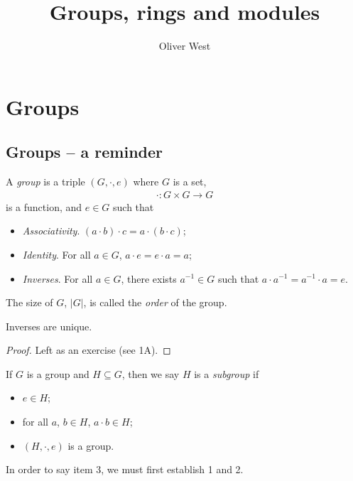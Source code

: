 \documentclass{../template/note}
\author{Oliver West}
\title{Groups, rings and modules}
\date{}
\begin{document}
    \maketitle

    \tableofcontents


    \section{Groups}

    \subsection{Groups -- a reminder}

    \begin{definition}
        A \emph{group} is a triple $(G, \cdot, e)$ where $G$ is a set, 
        \begin{align*}
            \cdot: G \times G \to G
        \end{align*}
        is a function, and $e \in G$ such that
        \begin{itemize}
            \item \emph{Associativity}. $(a \cdot b) \cdot c = a \cdot (b \cdot c)$;
            \item \emph{Identity}. For all $a \in G$, $a \cdot e = e \cdot a = a$;
            \item \emph{Inverses}. For all $a \in G$, there exists $a^{-1} \in G$ such that $a \cdot a^{-1} = a^{-1} \cdot a = e$.
        \end{itemize}
        The size of $G$, $|G|$, is called the \emph{order} of the group. 
    \end{definition}
    
    \begin{proposition}
        Inverses are unique.
    \end{proposition}

    \begin{proof}
        Left as an exercise (see 1A).
    \end{proof}
    
    \begin{definition}[Subgroups]
        If $G$ is a group and $H \subseteq G$, then we say $H$ is a \emph{subgroup} if
        \begin{itemize}
            \item $e \in H$;
            \item for all $a$, $b \in H$, $a \cdot b \in H$;
            \item $(H, \cdot, e)$ is a group.
        \end{itemize}
        In order to say item 3, we must first establish 1 and 2.
    \end{definition}
    
\end{document}
